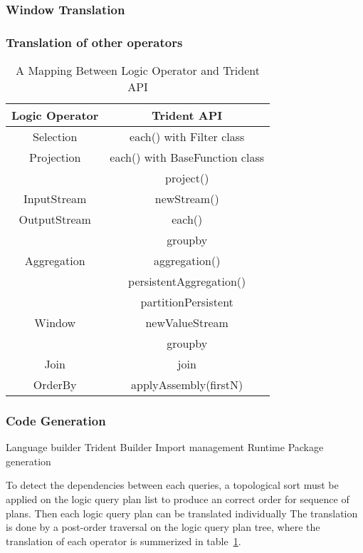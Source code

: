 \documentclass[conference, twocolumn, 11pt]{IEEEtran}
\theoremstyle{definition}
\begin{document}
\subsubsection{Window Translation}
\subsubsection{Translation of other operators}
\begin{table}[hbt]
\caption{A Mapping Between Logic Operator and Trident API}
\label{api-mapping}
\centering
\begin{tabular}{|c|c|}
\hline
Logic Operator & Trident API \\
\hline
Selection      & each() with Filter class \\
\hline
Projection     & each() with BaseFunction class \\
               & project() \\
\hline
InputStream    & newStream() \\
\hline
OutputStream   & each() \\
\hline
               & groupby       \\
Aggregation    & aggregation() \\
               & persistentAggregation() \\
\hline
               & partitionPersistent \\ 
Window         & newValueStream      \\ 
               & groupby             \\
\hline
Join           & join                 \\
\hline
OrderBy        & applyAssembly(firstN) \\
\hline
\end{tabular}
\end{table}

\subsubsection{Code Generation}
Language builder
Trident Builder
Import management
Runtime Package generation

To detect the dependencies between each queries, a topological sort must be applied on the logic query plan list to produce an correct order for sequence of plans. Then each logic query plan can be translated individually 
The translation is done by a post-order traversal on the logic query plan tree, where the translation of each operator is summerized in table~\ref{api-mapping}.
\end{document}
